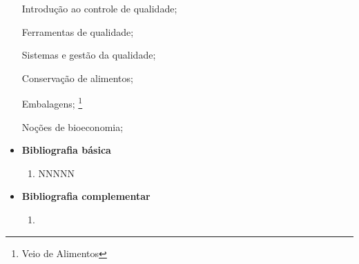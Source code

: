 \documentclass[11pt,fleqn]{book} %
\newcommand{\VER}[1]{\begingroup\color{red}#1\endgroup}
\begin{document}
\begin{itemize}
	Introdução ao controle de qualidade; 
	
	Ferramentas de qualidade; 
	
	Sistemas e gestão da qualidade;
	
	\VER{
		Conservação de alimentos;
		
		Embalagens;
		\footnote{Veio de Alimentos}}
	
	Noções de bioeconomia;
	
	\item \textbf{Bibliografia básica}
	\begin{enumerate}
		\item NNNNN
	\end{enumerate}
	\item \textbf{Bibliografia complementar}
	\begin{enumerate}
		\item 
	\end{enumerate}	
\end{itemize}


\newpage
\end{document}
